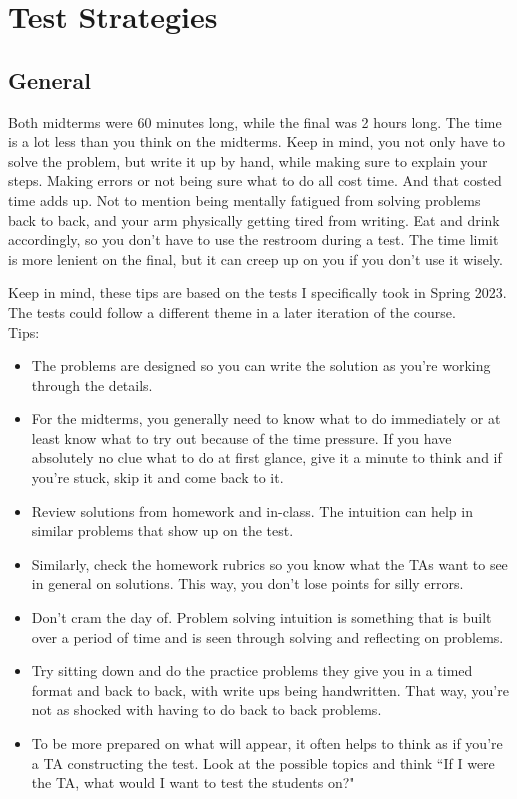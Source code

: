 \documentclass[11pt]{scrartcl}
\begin{document}
\section{Test Strategies}

\subsection{General}
Both midterms were 60 minutes long, while the final was 2 hours long. The time is a lot less than you think on the midterms. Keep in mind, you not only have to solve the problem, but write it up by hand, while making sure to explain your steps. Making errors or not being sure what to do all cost time. And that costed time adds up. Not to mention being mentally fatigued from solving problems back to back, and your arm physically getting tired from writing. Eat and drink accordingly, so you don't have to use the restroom during a test. The time limit is more lenient on the final, but it can creep up on you if you don't use it wisely.

Keep in mind, these tips are based on the tests I specifically took in Spring 2023. The tests could follow a different theme in a later iteration of the course. \\

\noindent
Tips:
\begin{itemize}
\item The problems are designed so you can write the solution as you're working through the details.
\item For the midterms, you generally need to know what to do immediately or at least know what to try out because of the time pressure. If you have absolutely no clue what to do at first glance, give it a minute to think and if you're stuck, skip it and come back to it.
\item Review solutions from homework and in-class. The intuition can help in similar problems that show up on the test.
\item Similarly, check the homework rubrics so you know what the TAs want to see in general on solutions. This way, you don't lose points for silly errors.
\item Don't cram the day of. Problem solving intuition is something that is built over a period of time and is seen through solving and reflecting on problems.
\item Try sitting down and do the practice problems they give you in a timed format and back to back, with write ups being handwritten. That way, you're not as shocked with having to do back to back problems.
\item To be more prepared on what will appear, it often helps to think as if you're a TA constructing the test. Look at the possible topics and think ``If I were the TA, what would I want to test the students on?"
\end{itemize}
\end{document}
